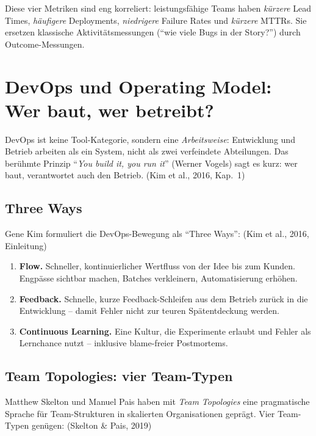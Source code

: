 \documentclass[11pt,a4paper,oneside]{article}
\newcommand{\quelle}[1]{{\footnotesize\color{lpGray}(#1)}}
\begin{document}
Diese vier Metriken sind eng korreliert: leistungsfähige Teams haben \emph{kürzere} Lead Times, \emph{häufigere} Deployments, \emph{niedrigere} Failure Rates und \emph{kürzere} MTTRs. Sie ersetzen klassische Aktivitätsmessungen (``wie viele Bugs in der Story?'') durch Outcome-Messungen.

\section{DevOps und Operating Model: Wer baut, wer betreibt?}

DevOps ist keine Tool-Kategorie, sondern eine \emph{Arbeitsweise}: Entwicklung und Betrieb arbeiten als ein System, nicht als zwei verfeindete Abteilungen. Das berühmte Prinzip ``\emph{You build it, you run it}'' (Werner Vogels) sagt es kurz: wer baut, verantwortet auch den Betrieb. \quelle{Kim et al., 2016, Kap.~1}

\subsection{Three Ways}

Gene Kim formuliert die DevOps-Bewegung als ``Three Ways'': \quelle{Kim et al., 2016, Einleitung}

\begin{enumerate}
  \item \textbf{Flow.} Schneller, kontinuierlicher Wertfluss von der Idee bis zum Kunden. Engpässe sichtbar machen, Batches verkleinern, Automatisierung erhöhen.
  \item \textbf{Feedback.} Schnelle, kurze Feedback-Schleifen aus dem Betrieb zurück in die Entwicklung -- damit Fehler nicht zur teuren Spätentdeckung werden.
  \item \textbf{Continuous Learning.} Eine Kultur, die Experimente erlaubt und Fehler als Lernchance nutzt -- inklusive blame-freier Postmortems.
\end{enumerate}

\subsection{Team Topologies: vier Team-Typen}

Matthew Skelton und Manuel Pais haben mit \emph{Team Topologies} eine pragmatische Sprache für Team-Strukturen in skalierten Organisationen geprägt. Vier Team-Typen genügen: \quelle{Skelton \& Pais, 2019}
\end{document}
